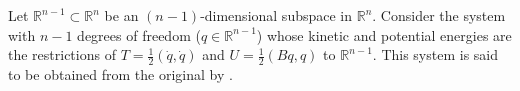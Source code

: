 Let $\mathbb{R}^{n-1} \subset \mathbb{R}^n$ be an $(n-1)$-dimensional subspace in $\mathbb{R}^n$. Consider the system with $n-1$ degrees of freedom ($q \in \mathbb{R}^{n-1}$) whose kinetic and potential energies are the restrictions of $T = \frac{1}{2}(\dot{q}, \dot{q})$ and $U = \frac{1}{2}(Bq, q)$ to $\mathbb{R}^{n-1}$. This system is said to be obtained from the original by .
